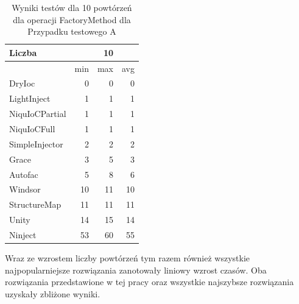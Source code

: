 \documentclass[12pt]{article}
\begin{document}
\begin{table}[H]
\captionsetup{belowskip=0pt,aboveskip=0pt}
\begin{center}
\begin{small}
	\begin{tabular}{ | l | r r r | }
    		\hline
Liczba & & 10 & \\ \hline
 & min & max & avg \\ \hline
DryIoc & 0 & 0 & 0 \\ \hline
LightInject & 1 & 1 & 1 \\ \hline
NiquIoCPartial & 1 & 1 & 1 \\ \hline
NiquIoCFull & 1 & 1 & 1 \\ \hline
SimpleInjector & 2 & 2 & 2 \\ \hline
Grace & 3 & 5 & 3 \\ \hline
Autofac & 5 & 8 & 6 \\ \hline
Windsor & 10 & 11 & 10 \\ \hline
StructureMap & 11 & 11 & 11 \\ \hline
Unity & 14 & 15 & 14 \\ \hline
Ninject & 53 & 60 & 55 \\ \hline
  	\end{tabular}
\end{small}
\end{center}
\caption{Wyniki testów dla 10 powtórzeń dla operacji FactoryMethod dla Przypadku testowego A}
\label{TestCaseA_FactoryMethod10}
\end{table}
Wraz ze wzrostem liczby powtórzeń tym razem również wszystkie najpopularniejsze rozwiązania zanotowały liniowy wzrost czasów. Oba rozwiązania przedstawione w tej pracy oraz wszystkie najszybsze rozwiązania uzyskały zbliżone wyniki.
\\ \\
\end{document}
